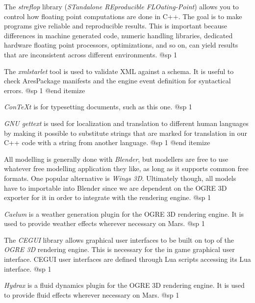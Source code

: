 \item
The {\sl streflop} library ({\sl STandalone REproducible FLOating-Point}) allows you to control how floating point computations are done in C++. The goal is to make programs give reliable and reproducible results. This is important because differences in machine generated code, numeric handling libraries, dedicated hardware floating point processors, optimizations, and so on, can yield results that are inconsistent across different environments.
@sp 1

\item
The {\sl xmlstarlet} tool is used to validate XML against a schema. It is useful to check AresPackage manifests and the engine event definition for syntactical errors.
@sp 1
@end itemize



\itemize
\item
{\sl ConTeXt} is for typesetting documents, such as this one.
@sp 1

\item
{\sl GNU gettext} is used for localization and translation to different human languages by making it possible to substitute strings that are marked for translation in our C++ code with a string from another language.
@sp 1
@end itemize


\itemize
\item
All modelling is generally done with {\sl Blender}, but modellers are free to use whatever free modelling application they like, as long as it supports common free formats. One popular alternative is {\sl Wings 3D}. Ultimately though, all models have to importable into Blender since we are dependent on the OGRE 3D exporter for it in order to integrate with the rendering engine.
@sp 1

\item
{\sl Caelum} is a weather generation plugin for the OGRE 3D rendering engine. It is used to provide weather effects wherever necessary on Mars.
@sp 1

\item
The {\sl CEGUI} library allows graphical user interfaces to be built on top of the {\sl OGRE 3D} rendering engine. This is necessary for the in game graphical user interface. CEGUI user interfaces are defined through Lua scripts accessing its Lua interface.
@sp 1

\item
{\sl Hydrax} is a fluid dynamics plugin for the OGRE 3D rendering engine. It is used to provide fluid effects wherever necessary on Mars.
@sp 1

